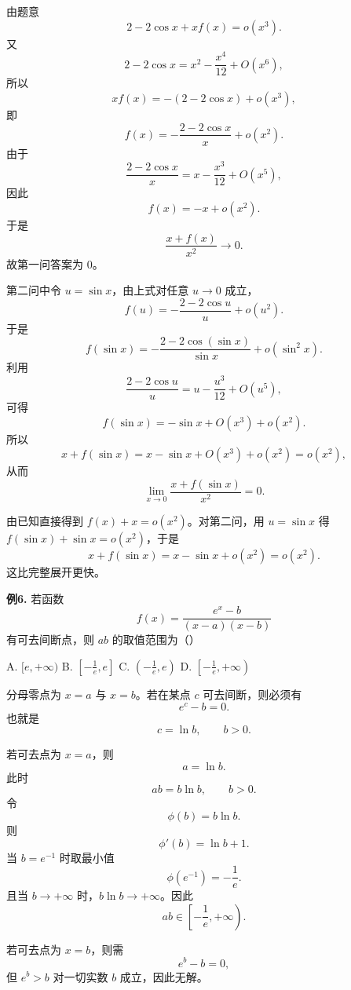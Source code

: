 \begin{solutionblock}

由题意
\[
2-2\cos x+x f(x)=o(x^3).
\]
又
\[
2-2\cos x=x^2-\frac{x^4}{12}+O(x^6),
\]
所以
\[
x f(x)=-(2-2\cos x)+o(x^3),
\]
即
\[
f(x)=-\frac{2-2\cos x}{x}+o(x^2).
\]
由于
\[
\frac{2-2\cos x}{x}=x-\frac{x^3}{12}+O(x^5),
\]
因此
\[
f(x)=-x+o(x^2).
\]
于是
\[
\frac{x+f(x)}{x^2}\to0.
\]
故第一问答案为 0。

第二问中令 \(u=\sin x\)，由上式对任意 \(u\to0\) 成立，
\[
f(u)=-\frac{2-2\cos u}{u}+o(u^2).
\]
于是
\[
f(\sin x)=-\frac{2-2\cos(\sin x)}{\sin x}+o(\sin^2x).
\]
利用
\[
\frac{2-2\cos u}{u}=u-\frac{u^3}{12}+O(u^5),
\]
可得
\[
f(\sin x)=-\sin x+O(x^3)+o(x^2).
\]
所以
\[
x+f(\sin x)=x-\sin x+O(x^3)+o(x^2)=o(x^2),
\]
从而
\[
\lim_{x\to0}\frac{x+f(\sin x)}{x^2}=0.
\]

由已知直接得到 \(f(x)+x=o(x^2)\)。对第二问，用 \(u=\sin x\) 得 \(f(\sin x)+\sin x=o(x^2)\)，于是
\[
x+f(\sin x)=x-\sin x+o(x^2)=o(x^2).
\]
这比完整展开更快。

\end{solutionblock}

\begin{problemblock}
\textbf{例6.} 若函数
\[
f(x)=\frac{e^x-b}{(x-a)(x-b)}
\]
有可去间断点，则 \(ab\) 的取值范围为（\quad）

A. \([e,+\infty)\) \qquad
B. \(\left[-\frac1e,e\right]\) \qquad
C. \(\left(-\frac1e,e\right)\) \qquad
D. \(\left[-\frac1e,+\infty\right)\)
\end{problemblock}

\begin{solutionblock}

分母零点为 \(x=a\) 与 \(x=b\)。若在某点 \(c\) 可去间断，则必须有
\[
e^c-b=0.
\]
也就是
\[
c=\ln b,\qquad b>0.
\]

若可去点为 \(x=a\)，则
\[
a=\ln b.
\]
此时
\[
ab=b\ln b,\qquad b>0.
\]
令
\[
\phi(b)=b\ln b.
\]
则
\[
\phi'(b)=\ln b+1.
\]
当 \(b=e^{-1}\) 时取最小值
\[
\phi(e^{-1})=-\frac1e.
\]
且当 \(b\to+\infty\) 时，\(b\ln b\to+\infty\)。因此
\[
ab\in\left[-\frac1e,+\infty\right).
\]

若可去点为 \(x=b\)，则需
\[
e^b-b=0,
\]
但 \(e^b>b\) 对一切实数 \(b\) 成立，因此无解。

\end{solutionblock}

